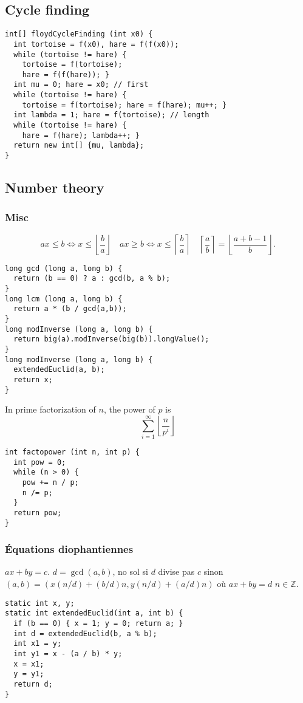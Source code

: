 \subsection{Cycle finding}
\begin{lstlisting}
int[] floydCycleFinding (int x0) {
  int tortoise = f(x0), hare = f(f(x0));
  while (tortoise != hare) {
    tortoise = f(tortoise);
    hare = f(f(hare)); }
  int mu = 0; hare = x0; // first
  while (tortoise != hare) {
    tortoise = f(tortoise); hare = f(hare); mu++; }
  int lambda = 1; hare = f(tortoise); // length
  while (tortoise != hare) {
    hare = f(hare); lambda++; }
  return new int[] {mu, lambda};
}
\end{lstlisting}

\subsection{Number theory}
\subsubsection{Misc}
\[
  ax \leq b \Leftrightarrow x \leq \left\lfloor \frac{b}{a} \right\rfloor \quad
  ax \geq b \Leftrightarrow x \leq \left\lceil \frac{b}{a} \right\rceil \quad
  \left\lceil \frac{a}{b} \right\rceil = \left\lfloor \frac{a+b-1}{b} \right\rfloor.
\]
\begin{lstlisting}
long gcd (long a, long b) {
  return (b == 0) ? a : gcd(b, a % b);
}
long lcm (long a, long b) {
  return a * (b / gcd(a,b));
}
long modInverse (long a, long b) {
  return big(a).modInverse(big(b)).longValue();
}
long modInverse (long a, long b) {
  extendedEuclid(a, b);
  return x;
}
\end{lstlisting}
In prime factorization of $n$, the power of $p$ is
\[\sum_{i=1}^{\infty} \left\lfloor \frac{n}{p^i} \right\rfloor\]
\begin{lstlisting}
int factopower (int n, int p) {
  int pow = 0;
  while (n > 0) {
    pow += n / p;
    n /= p;
  }
  return pow;
}
\end{lstlisting}

\subsubsection{Équations diophantiennes}
$ax + by = c$. $d = \gcd(a,b)$, no sol si $d$ divise pas $c$ sinon $(a,b) = (x (n/d) + (b/d)n, y (n/d) + (a/d)n)$ où $ax + by = d$ $n \in \mathbb{Z}$.
\begin{lstlisting}
static int x, y;
static int extendedEuclid(int a, int b) {
  if (b == 0) { x = 1; y = 0; return a; }
  int d = extendedEuclid(b, a % b);
  int x1 = y;
  int y1 = x - (a / b) * y;
  x = x1;
  y = y1;
  return d;
}
\end{lstlisting}

